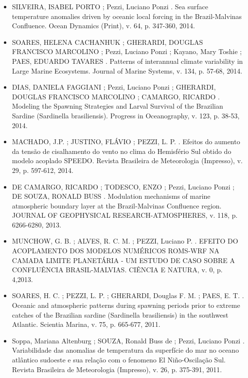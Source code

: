 \documentclass[11pt, a4paper]{awesome-cv}
\begin{document}
\begin{cvletter}
\begin{itemize}
  \item[] SILVEIRA, ISABEL PORTO ; Pezzi, Luciano Ponzi . Sea surface temperature anomalies driven by
  oceanic local forcing in the Brazil-Malvinas Confluence. Ocean Dynamics (Print), v. 64, p. 347-360, 
  2014.

  \item[] SOARES, HELENA CACHANHUK ; GHERARDI, DOUGLAS FRANCISCO MARCOLINO ; Pezzi, Luciano Ponzi ; 
  Kayano, Mary Toshie ; PAES, EDUARDO TAVARES . Patterns of interannual climate variability in Large 
  Marine Ecosystems. Journal of Marine Systems, v. 134, p. 57-68,
  2014.

  \item[] DIAS, DANIELA FAGGIANI ; Pezzi, Luciano Ponzi ; GHERARDI, DOUGLAS FRANCISCO MARCOLINO ; 
  CAMARGO, RICARDO . Modeling the Spawning Strategies and Larval Survival of the Brazilian Sardine 
  (Sardinella brasiliensis). Progress in Oceanography, v. 123, p. 38-53,
  2014.

  \item[] MACHADO, J.P. ; JUSTINO, FLÁVIO ; PEZZI, L. P. . Efeitos do aumento da tensão de cisalhamento 
  do vento no clima do Hemisfério Sul obtido do modelo acoplado SPEEDO. Revista Brasileira de 
  Meteorologia (Impresso), v. 29, p. 597-612,
  2014.

  \item[] DE CAMARGO, RICARDO ; TODESCO, ENZO ; Pezzi, Luciano Ponzi ; DE SOUZA, RONALD BUSS . 
  Modulation mechanisms of marine atmospheric boundary layer at the Brazil-Malvinas Confluence region. 
  JOURNAL OF GEOPHYSICAL RESEARCH-ATMOSPHERES, v. 118, p. 6266-6280, 2013.

  \item[] MUNCHOW, G. B. ; ALVES, R. C. M. ; PEZZI, Luciano P. . EFEITO DO ACOPLAMENTO DOS MODELOS 
  NUMÉRICOS ROMS-WRF NA CAMADA LIMITE PLANETÁRIA - UM ESTUDO DE CASO SOBRE A CONFLUÊNCIA 
  BRASIL-MALVIAS. CIÊNCIA E NATURA, v. 0, p. 4,2013.

  \item[] SOARES, H. C. ; PEZZI, L. P. ; GHERARDI, Douglas F. M. ; PAES, E. T. . Oceanic and 
  atmospheric patterns during spawning periods prior to extreme catches of the Brazilian sardine 
  (Sardinella brasiliensis) in the southwest Atlantic. Scientia Marina, v. 75, p. 665-677,
  2011.

  \item[] Soppa, Mariana Altenburg ; SOUZA, Ronald Buss de ; Pezzi, Luciano Ponzi . Variabilidade das 
  anomalias de temperatura da superfície do mar no oceano atlântico sudoeste e sua relação com o 
  fenomeno El Niño-Oscilação Sul. Revista Brasileira de Meteorologia (Impresso), v. 26, p. 375-391, 
  2011.


\end{itemize}
\end{cvletter}
\end{document}
